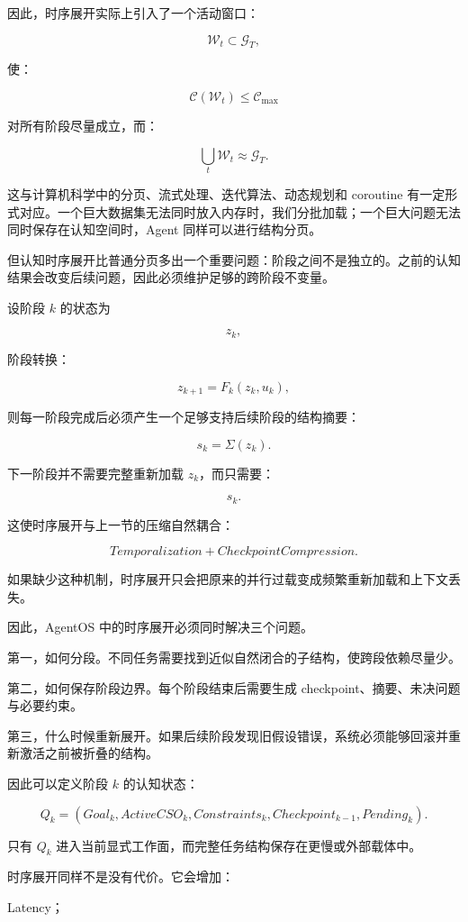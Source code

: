 因此，时序展开实际上引入了一个活动窗口：

\[
\mathcal W_t
\subset
\mathcal G_T,
\]

使：

\[
\mathcal C(\mathcal W_t)
\leq
\mathcal C_{\max}
\]

对所有阶段尽量成立，而：

\[
\bigcup_t
\mathcal W_t
\approx
\mathcal G_T.
\]

这与计算机科学中的分页、流式处理、迭代算法、动态规划和 coroutine 有一定形式对应。一个巨大数据集无法同时放入内存时，我们分批加载；一个巨大问题无法同时保存在认知空间时，Agent 同样可以进行结构分页。

但认知时序展开比普通分页多出一个重要问题：阶段之间不是独立的。之前的认知结果会改变后续问题，因此必须维护足够的跨阶段不变量。

设阶段 $k$ 的状态为

\[
z_k,
\]

阶段转换：

\[
z_{k+1}
=
F_k(z_k,u_k),
\]

则每一阶段完成后必须产生一个足够支持后续阶段的结构摘要：

\[
s_k
=
\Sigma(z_k).
\]

下一阶段并不需要完整重新加载 $z_k$，而只需要：

\[
s_k.
\]

这使时序展开与上一节的压缩自然耦合：

\[
\boxed{
Temporalization
+
CheckpointCompression.
}
\]

如果缺少这种机制，时序展开只会把原来的并行过载变成频繁重新加载和上下文丢失。

因此，AgentOS 中的时序展开必须同时解决三个问题。

第一，如何分段。不同任务需要找到近似自然闭合的子结构，使跨段依赖尽量少。

第二，如何保存阶段边界。每个阶段结束后需要生成 checkpoint、摘要、未决问题与必要约束。

第三，什么时候重新展开。如果后续阶段发现旧假设错误，系统必须能够回滚并重新激活之前被折叠的结构。

因此可以定义阶段 $k$ 的认知状态：

\[
Q_k
=
(
Goal_k,
ActiveCSO_k,
Constraints_k,
Checkpoint_{k-1},
Pending_k
).
\]

只有 $Q_k$ 进入当前显式工作面，而完整任务结构保存在更慢或外部载体中。

时序展开同样不是没有代价。它会增加：

Latency；

